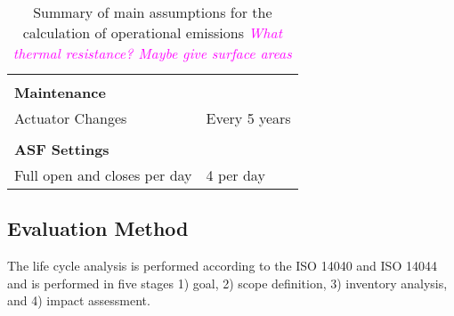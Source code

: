 \begin{description}
\begin{table}[H]
\begin{tabular}{ll}
                              &                                                \\
\textbf{Maintenance}          &                                                \\
Actuator Changes              & Every 5 years                                  \\
                              &                                                \\
\textbf{ASF Settings}         &                                                \\
Full open and closes per day  & 4 per day                                      \\
\hline
\end{tabular}
\caption{Summary of main assumptions for the calculation of operational emissions \textcolor{magenta}{\textit{What thermal resistance? Maybe give surface areas}}}
\label{tab:AssumptionsOpp}
\end{table}


\end{description}

\subsection{Evaluation Method}
The life cycle analysis is performed according to the ISO 14040 and ISO 14044 and is performed in five stages 1) goal, 2) scope definition, 3) inventory analysis, and 4) impact assessment.

